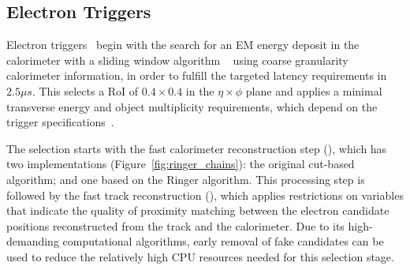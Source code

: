 \subsection{Electron Triggers}\label{ssec:egamma_trigger}


Electron triggers~\cite{aad2020performance} begin with
the search for an EM energy deposit in the calorimeter with a \licalo{} sliding
window algorithm ~\cite{Franchino:2730851} using coarse granularity calorimeter information, in order to
fulfill the targeted latency requirements in $2.5\mu s$. This selects a RoI of $0.4\times 0.4$
in the $\eta\times\phi$ plane and applies a minimal transverse energy and object
multiplicity requirements, which depend on the trigger
specifications~\cite{TRIG-2016-01}.
 
The \hlt{} selection starts with the fast calorimeter reconstruction
step (\fastcalo), which has two implementations
(Figure~\ref{fig:ringer_chains}): the original cut-based algorithm; and one based on the Ringer algorithm. 
This processing step is followed by the fast track reconstruction
(\fastelectron), which applies restrictions on variables that indicate the quality of proximity matching between the electron candidate positions reconstructed from the track and the calorimeter. Due to its high-demanding computational algorithms, early removal of fake candidates can be used to reduce the relatively high CPU resources needed for this selection stage.


